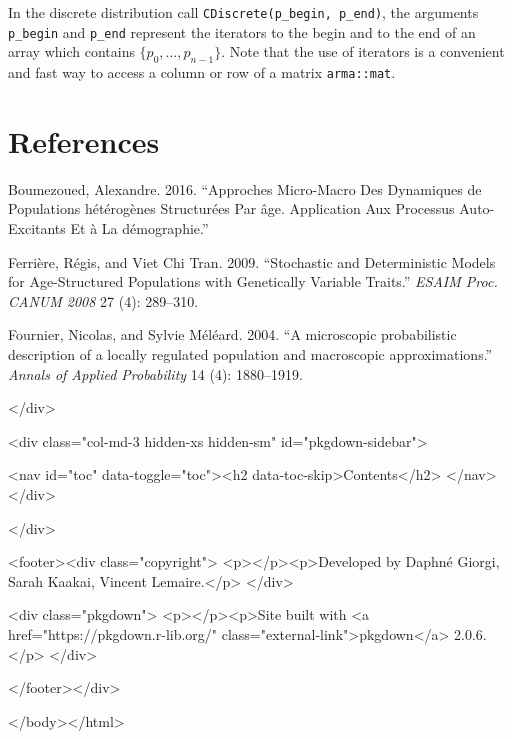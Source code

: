 In the discrete distribution call \texttt{CDiscrete(p\_begin,\ p\_end)}, the arguments \texttt{p\_begin} and \texttt{p\_end} represent the iterators to the begin and to the end of an array which contains \(\{p_0, \dots, p_{n-1}\}\). Note that the use of iterators is a convenient and fast way to access a column or row of a matrix \texttt{arma::mat}.

\hypertarget{references}{%
\section{References}\label{references}}

\hypertarget{refs}{}
\begin{CSLReferences}{1}{0}
\leavevmode{}%
Boumezoued, Alexandre. 2016. {``Approches Micro-Macro Des Dynamiques de Populations h{é}t{é}rog{è}nes Structur{é}es Par {â}ge. Application Aux Processus Auto-Excitants Et {à} La d{é}mographie.''}

\leavevmode{}%
Ferrière, Régis, and Viet Chi Tran. 2009. {``Stochastic and Deterministic Models for Age-Structured Populations with Genetically Variable Traits.''} \emph{ESAIM Proc. C{ANUM} 2008} 27 (4): 289--310.

\leavevmode{}%
Fournier, Nicolas, and Sylvie Méléard. 2004. {``{A microscopic probabilistic description of a locally regulated population and macroscopic approximations}.''} \emph{Annals of Applied Probability} 14 (4): 1880--1919.

\end{CSLReferences}
  </div>

  <div class="col-md-3 hidden-xs hidden-sm" id="pkgdown-sidebar">

        <nav id="toc" data-toggle="toc"><h2 data-toc-skip>Contents</h2>
    </nav>
      </div>

</div>



      <footer><div class="copyright">
  <p></p><p>Developed by Daphné Giorgi, Sarah Kaakai, Vincent Lemaire.</p>
</div>

<div class="pkgdown">
  <p></p><p>Site built with <a href="https://pkgdown.r-lib.org/" class="external-link">pkgdown</a> 2.0.6.</p>
</div>

      </footer></div>

  


  

  </body></html>
